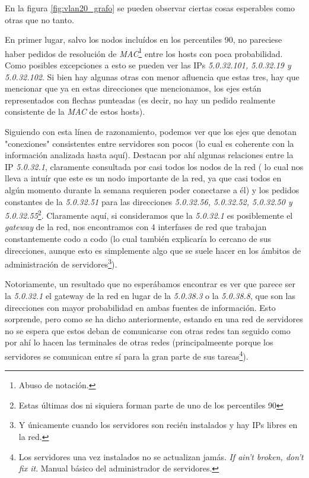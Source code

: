 \par En la figura \ref{fig:vlan20_grafo} se pueden observar ciertas cosas esperables
como otras que no tanto.

\par En primer lugar, salvo los nodos inclu\'idos en los percentiles 90, no pareciese
haber pedidos de resoluci\'on de \textit{MAC}\footnote{Abuso de notaci\'on.} entre
los hosts con poca probabilidad. Como posibles excepciones a esto se pueden ver las
IPs \textit{5.0.32.101, 5.0.32.19 y 5.0.32.102}. Si bien hay algunas otras con menor
afluencia que estas tres, hay que mencionar que ya en estas direcciones que mencionamos,
los ejes est\'an representados con flechas punteadas (es decir, no hay un pedido realmente
consistente de la \textit{MAC} de estos hosts).

\par Siguiendo con esta l\'inea de razonamiento, podemos ver que los ejes que denotan
"conexiones" consistentes entre servidores son pocos (lo cual es coherente con la
informaci\'on analizada hasta aqu\'i). Destacan por ah\'i algunas relaciones entre
la IP \textit{5.0.32.1}, claramente consultada por casi todos los nodos de la red (%
lo cual nos lleva a intu\'ir que este es un nodo importante de la red, ya que casi
todos en alg\'un momento durante la semana requieren poder conectarse a \'el) y 
los pedidos constantes de la \textit{5.0.32.51} para las direcciones \textit{5.0.32.56,
5.0.32.52, 5.0.32.50 y 5.0.32.55}\footnote{Estas \'ultimas dos ni siquiera forman
parte de uno de los percentiles 90}. Claramente aqu\'i, si consideramos que la
\textit{5.0.32.1} es posiblemente el \textit{gateway} de la red, nos encontramos
con 4 interfases de red que trabajan constantemente codo a codo (lo cual tambi\'en
explicar\'ia lo cercano de sus direcciones, aunque esto es simplemente algo que
se suele hacer en los \'ambitos de administraci\'on de servidores\footnote{Y \'unicamente
cuando los servidores son reci\'en instalados y hay IPs libres en la red.}).

\par Notoriamente, un resultado que no esper\'abamos encontrar es ver que parece
ser la \textit{5.0.32.1} el gateway de la red en lugar de la \textit{5.0.38.3} o la
\textit{5.0.38.8}, que son las direcciones con mayor probabilidad en ambas fuentes de informaci\'on.
Esto sorprende, pero como se ha dicho anteriormente, estando en una red de servidores no se espera
que estos deban de comunicarse con otras redes tan seguido como por ah\'i lo hacen
las terminales de otras redes (principalmeente porque los servidores se comunican
entre s\'i para la gran parte de sus tareas\footnote{Los servidores una vez instalados
no se actualizan jam\'as. \textit{If ain't broken, don't fix it}. Manual b\'asico
del administrador de servidores.}).

